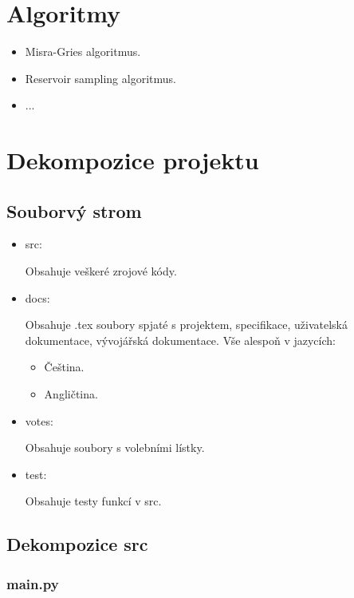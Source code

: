 \documentclass[a4paper,12pt]{report}
\begin{document}
	\section{Algoritmy}
	
	\begin{itemize}
		\item Misra-Gries algoritmus.
		\item Reservoir sampling algoritmus.
		\item ...
	\end{itemize}
	
	\section{Dekompozice projektu}
	
	\subsection{Souborvý strom}
	
	\begin{itemize}
		\item src:
		
		Obsahuje veškeré zrojové kódy.
		
		\item docs:
		
		Obsahuje .tex soubory spjaté s projektem, specifikace, uživatelská dokumentace, vývojářská dokumentace. Vše alespoň v jazycích:
		
		\begin{itemize}
			\item Čeština.
			\item Angličtina.
		\end{itemize}
		
		\item votes:
		
		Obsahuje soubory s volebními lístky.
		
		\item test:
		
		Obsahuje testy funkcí v src.
	\end{itemize}
	
	\subsection{Dekompozice src}
	
	\subsubsection{main.py}
	
\end{document}
